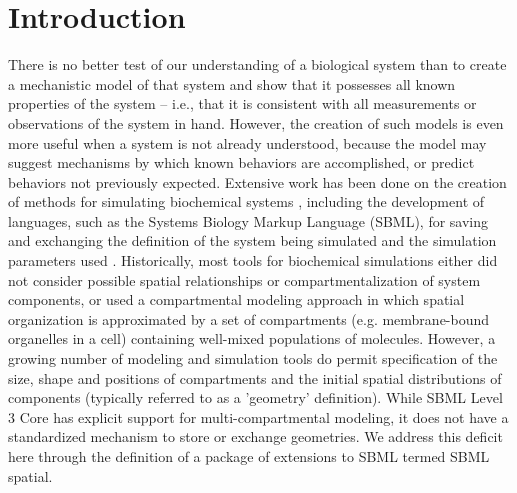 
\section{Introduction}
\label{intro}

There is no better test of our understanding of a biological system than to create a mechanistic model of that system and show that it possesses all known properties of the system -- i.e., that it is consistent with all measurements or observations of the system in hand. However, the creation of such models is even more useful when a system is not already understood, because the model may suggest mechanisms by which known behaviors are accomplished, or predict behaviors not previously expected. Extensive work has been done on the creation of methods for simulating biochemical systems \citep{hoops:2006, tomita:1999, loew:2001, stiles:1998, blinov:2004, andrews:2004}, including the development of languages, such as the Systems Biology Markup Language (SBML), for saving and exchanging the definition of the system being simulated and the simulation parameters used \citep{keating:2020, hucka:2003}. Historically, most tools for biochemical simulations either did not consider possible spatial relationships or compartmentalization of system components, or used a compartmental modeling approach \citep{jacquez:1985} in which spatial organization is approximated by a set of compartments (e.g. membrane-bound organelles in a cell) containing well-mixed populations of molecules. However, a growing number of modeling and simulation tools do permit specification of the size, shape and positions of compartments and the initial spatial distributions of components (typically referred to as a 'geometry' definition). While SBML Level 3 Core has explicit support for multi-compartmental modeling, it does not have a standardized mechanism to store or exchange geometries. We address this deficit here through the definition of a package of extensions to SBML termed SBML spatial.

